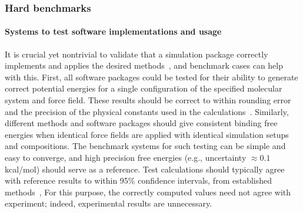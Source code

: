 \documentclass[aps,pre,twocolumn,nofootinbib,superscriptaddress,10pt, final,tightenlines]{revtex4-1}
\begin{document}
\subsubsection{Hard benchmarks}

\paragraph{Systems to test software implementations and usage}
It is crucial yet nontrivial to validate that a simulation package correctly implements and applies the desired methods~\cite{shirts_lessons_2016}, and benchmark cases can help with this.  
First, all software packages could be tested for their ability to generate correct potential energies for a single configuration of the specified molecular system and force field. 
These results should be correct to within rounding error and the precision of the physical constants used in the calculations~\cite{shirts_lessons_2016}. 
Similarly, different methods and software packages should give consistent binding free energies when identical force fields are applied with identical simulation setups and compositions. 
The benchmark systems for such testing can be simple and easy to converge, and high precision free energies (e.g., uncertainty $\approx 0.1$ kcal/mol) should serve as a reference. 
Test calculations should typically agree with reference results to within 95\% confidence intervals, from established methods~\cite{shirts_statistically_2008,flyvbjerg_error_1989},
For this purpose, the correctly computed values need not agree with experiment; indeed, experimental results are unnecessary.
\end{document}
